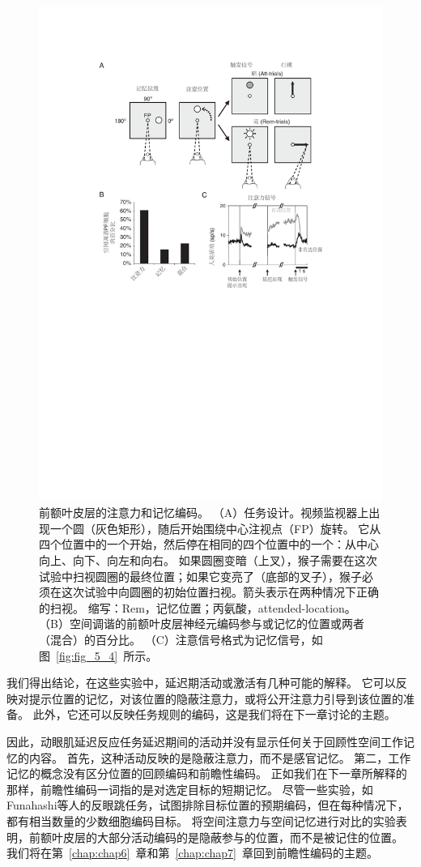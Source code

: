\begin{figure}
	\centering
	\includegraphics[width=0.7\linewidth]{chap5/Fig_5_6}
	\caption{前额叶皮层的注意力和记忆编码。
		（A）任务设计。视频监视器上出现一个圆（灰色矩形），随后开始围绕中心注视点（FP）旋转。
		它从四个位置中的一个开始，然后停在相同的四个位置中的一个：从中心向上、向下、向左和向右。
		如果圆圈变暗（上叉），猴子需要在这次试验中扫视圆圈的最终位置；如果它变亮了（底部的叉子），猴子必须在这次试验中向圆圈的初始位置扫视。箭头表示在两种情况下正确的扫视。
		缩写：Rem，记忆位置；丙氨酸，attended-location。
		（B）空间调谐的前额叶皮层神经元编码参与或记忆的位置或两者（混合）的百分比。
		（C）注意信号格式为记忆信号，如图~\ref{fig:fig_5_4}~所示\cite{lebedev2004representation}。}
	\label{fig:fig_5_6}
\end{figure}


我们得出结论，在这些实验中，延迟期活动或激活有几种可能的解释。
它可以反映对提示位置的记忆，对该位置的隐蔽注意力，或将公开注意力引导到该位置的准备。
此外，它还可以反映任务规则的编码，这是我们将在下一章讨论的主题。


因此，动眼肌延迟反应任务延迟期间的活动并没有显示任何关于回顾性空间工作记忆的内容。
首先，这种活动反映的是隐蔽注意力，而不是感官记忆。
第二，工作记忆的概念没有区分位置的回顾编码和前瞻性编码。
正如我们在下一章所解释的那样，前瞻性编码一词指的是对选定目标的短期记忆。
尽管一些实验，如Funahashi等人的反眼跳任务，试图排除目标位置的预期编码，但在每种情况下，都有相当数量的少数细胞编码目标。
将空间注意力与空间记忆进行对比的实验表明，前额叶皮层的大部分活动编码的是隐蔽参与的位置，而不是被记住的位置。
我们将在第~\ref{chap:chap6}~章和第~\ref{chap:chap7}~章回到前瞻性编码的主题。



